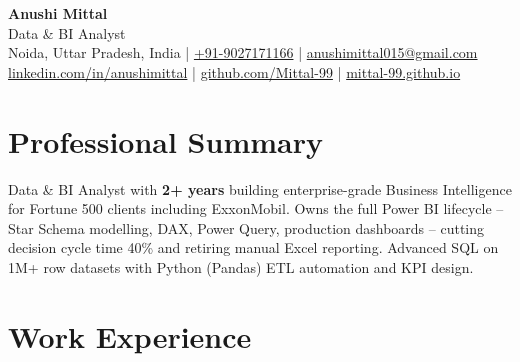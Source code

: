 \documentclass[a4paper,10pt]{article}
\begin{document}
\begin{center}
  {\LARGE\bfseries\textcolor{accent}{Anushi Mittal}}\\[3pt]
  {\normalsize Data \& BI Analyst}\\[3pt]
  {\small
    Noida, Uttar Pradesh, India \textcolor{rulegrey}{|}
    \href{tel:+919027171166}{+91-9027171166} \textcolor{rulegrey}{|}
    \href{mailto:anushimittal015@gmail.com}{anushimittal015@gmail.com}
  }\\[3pt]
  {\small
    \href{https://www.linkedin.com/in/anushimittal}{linkedin.com/in/anushimittal} \textcolor{rulegrey}{|}
    \href{https://github.com/Mittal-99}{github.com/Mittal-99} \textcolor{rulegrey}{|}
    \href{https://mittal-99.github.io}{mittal-99.github.io}
  }
\end{center}
\vspace{-2pt}

\section{Professional Summary}
Data \& BI Analyst with \textbf{2+ years} building enterprise-grade Business Intelligence for Fortune 500 clients including ExxonMobil.
Owns the full Power BI lifecycle -- Star Schema modelling, DAX, Power Query, production dashboards -- cutting decision cycle time
40\% and retiring manual Excel reporting. Advanced SQL on 1M+ row datasets with Python (Pandas) ETL automation and KPI design.

\section{Work Experience}
\end{document}
